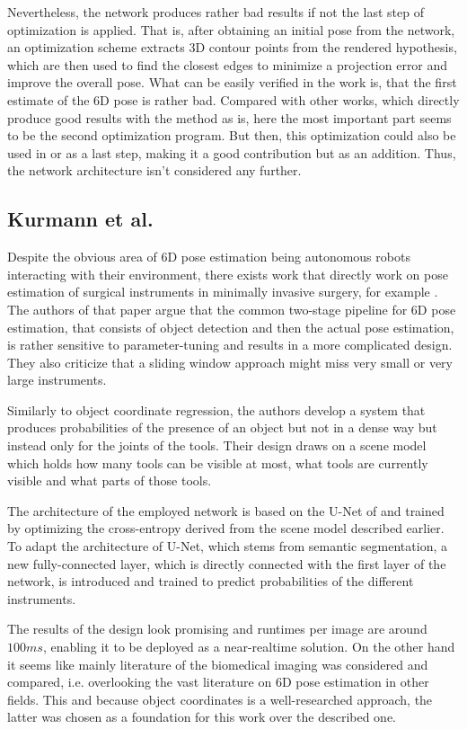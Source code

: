 Nevertheless, the network produces rather bad results if not the last step of optimization is applied. That is, after obtaining an initial pose from the network, an optimization scheme extracts 3D contour points from the rendered hypothesis, which are then used to find the closest edges to minimize a projection error and improve the overall pose. What can be easily verified in the work is, that the first estimate of the 6D pose is rather bad. Compared with other works, which directly produce good results with the method as is, here the most important part seems to be the second optimization program. But then, this optimization could also be used in \cite{brachmann2} or \cite{bb8} as a last step, making it a good contribution but as an addition. Thus, the network architecture isn’t considered any further.

\subsection{Kurmann et al.}

Despite the obvious area of 6D pose estimation being autonomous robots interacting with their environment, there exists work that directly work on pose estimation of surgical instruments in minimally invasive surgery, for example \cite{kurmann}. The authors of that paper argue that the common two-stage pipeline for 6D pose estimation, that consists of object detection and then the actual pose estimation, is rather sensitive to parameter-tuning and results in a more complicated design. They also criticize that a sliding window approach might miss very small or very large instruments. 

Similarly to object coordinate regression, the authors develop a system that produces probabilities of the presence of an object but not in a dense way but instead only for the joints of the tools. Their design draws on a scene model which holds how many tools can be visible at most, what tools are currently visible and what parts of those tools. 

The architecture of the employed network is based on the U-Net of \cite{oronneberger} and trained by optimizing the cross-entropy derived from the scene model described earlier. To adapt the architecture of U-Net, which stems from semantic segmentation, a new fully-connected layer, which is directly connected with the first layer of the network, is introduced and trained to predict probabilities of the different instruments. 

The results of the design look promising and runtimes per image are around $100 ms$, enabling it to be deployed as a near-realtime solution. On the other hand it seems like mainly literature of the biomedical imaging was considered and compared, i.e. overlooking the vast literature on 6D pose estimation in other fields. This and because object coordinates is a well-researched approach, the latter was chosen as a foundation for this work over the described one. 

